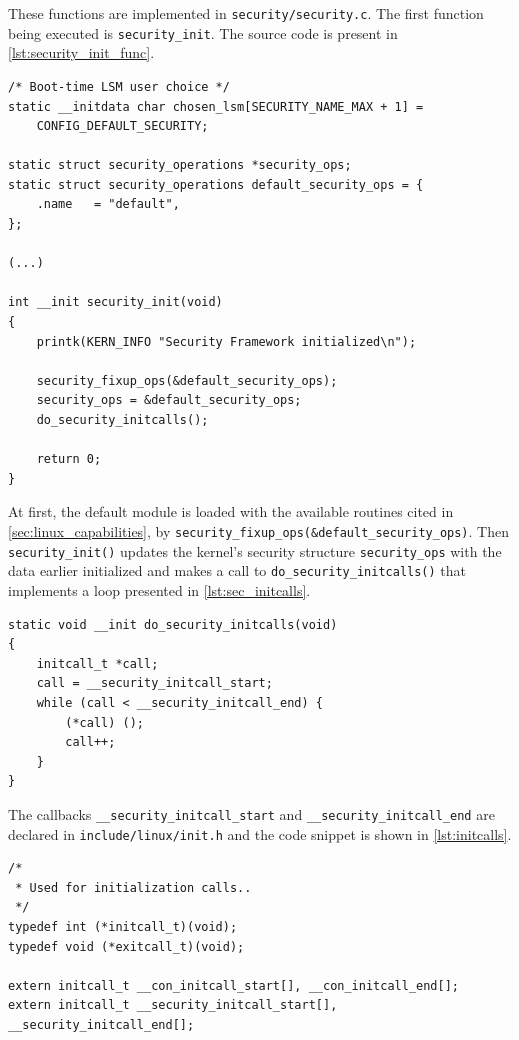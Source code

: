 \noindent
These functions are implemented in \texttt{security/security.c}. The first function being executed is \texttt{security\_init}. The source code is present in \autoref{lst:security_init_func}.

\begin{lstlisting}[frame=none, numbers=none, caption=\texttt{security\_init} function (Linux kernel v3.11), label=lst:security_init_func]
/* Boot-time LSM user choice */
static __initdata char chosen_lsm[SECURITY_NAME_MAX + 1] =
	CONFIG_DEFAULT_SECURITY;

static struct security_operations *security_ops;
static struct security_operations default_security_ops = {
	.name	= "default",
};

(...)

int __init security_init(void)
{
	printk(KERN_INFO "Security Framework initialized\n");

	security_fixup_ops(&default_security_ops);
	security_ops = &default_security_ops;
	do_security_initcalls();

	return 0;
}
\end{lstlisting}

\noindent
At first, the default module is loaded with the available routines cited in \autoref{sec:linux_capabilities}, by \texttt{security\_fixup\_ops(\&default\_security\_ops)}. Then \texttt{security\_init()} updates the kernel's security structure \texttt{security\_ops} with the data earlier initialized and makes a call to \texttt{do\_security\_initcalls()} that implements a loop presented in \autoref{lst:sec_initcalls}.

\begin{lstlisting}[frame=none, numbers=none, caption=\texttt{do\_security\_initcalls} function (Linux kernel v3.11), label=lst:sec_initcalls]
static void __init do_security_initcalls(void)
{
	initcall_t *call;
	call = __security_initcall_start;
	while (call < __security_initcall_end) {
		(*call) ();
		call++;
	}
}
\end{lstlisting}

\noindent
The callbacks \texttt{\_\_security\_initcall\_start} and \texttt{\_\_security\_initcall\_end} are declared in \texttt{include/linux/init.h} and the code snippet is shown in \autoref{lst:initcalls}.

\begin{lstlisting}[frame=none, numbers=none, caption=\texttt{init} callbacks (Linux kernel v3.11), label=lst:initcalls]
/*
 * Used for initialization calls..
 */
typedef int (*initcall_t)(void);
typedef void (*exitcall_t)(void);

extern initcall_t __con_initcall_start[], __con_initcall_end[];
extern initcall_t __security_initcall_start[], __security_initcall_end[];
\end{lstlisting}

